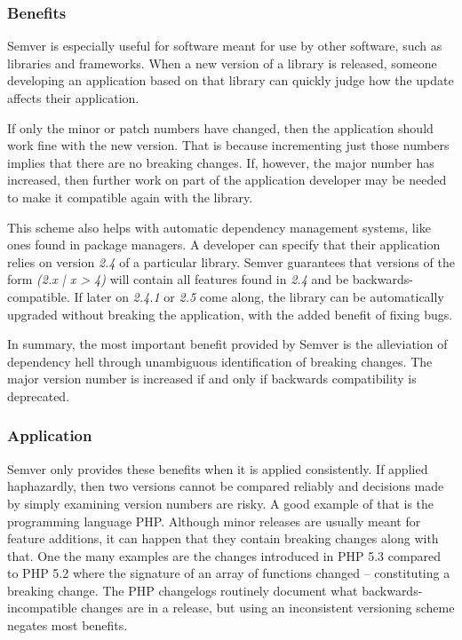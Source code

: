 \documentclass{l4proj}
\begin{document}
\subsubsection{Benefits}

Semver is especially useful for software meant for use by other
software, such as libraries and frameworks. When a new version of a
library is released, someone developing an application based on that
library can quickly judge how the update affects their application.

If only the minor or patch numbers have changed, then the application
should work fine with the new version. That is because incrementing
just those numbers implies that there are no breaking changes. If,
however, the major number has increased, then further work on part of
the application developer may be needed to make it compatible again
with the library.

This scheme also helps with automatic dependency management systems,
like ones found in package managers. A developer can specify that
their application relies on version \textit{2.4} of a particular
library. Semver guarantees that versions of the form \textit{(2.x | x
> 4)} will contain all features found in \textit{2.4} and be
backwards-compatible. If later on \textit{2.4.1} or \textit{2.5} come
along, the library can be automatically upgraded without breaking the
application, with the added benefit of fixing bugs.

In summary, the most important benefit provided by Semver is the
alleviation of dependency hell through unambiguous identification of
breaking changes. The major version number is increased if and only if
backwards compatibility is deprecated.

\subsubsection{Application}

Semver only provides these benefits when it is applied consistently.
If applied haphazardly, then two versions cannot be compared
reliably and decisions made by simply examining version numbers are
risky. A good example of that is the programming language PHP.
Although minor releases are usually meant for feature additions, it
can happen that they contain breaking changes along with that.
One the many examples are the changes introduced in PHP 5.3
compared to PHP 5.2\cite{PHPChangelog} where the signature of an array
of functions changed -- constituting a breaking change. The PHP
changelogs routinely document what backwards-incompatible changes are
in a release, but using an inconsistent versioning scheme negates
most benefits.
\end{document}
